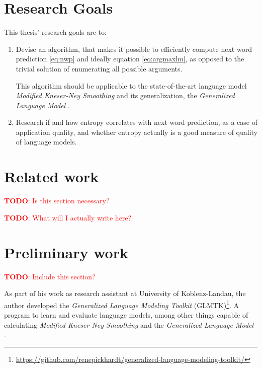 \documentclass[11pt,a4paper]{article}
\newcommand{\todo}[1]{\textcolor{red}{\textbf{TODO}: #1}}
\begin{document}
\section{Research Goals}

This thesis' research goals are to:
\begin{enumerate}[label=(\alph*)]
  \item
    Devise an algorithm, that makes it possible to efficiently compute
    next word prediction \eqref{eq:nwp} and ideally equation
    \eqref{eq:argmaxlm}, as opposed to the trivial solution of enumerating
    all possible arguments.

    This algorithm should be applicable to the state-of-the-art language model
    \emph{Modified Kneser-Ney Smoothing} \parencite{ChenGoodman1999} and its
    generalization, the \emph{Generalized Language Model}
    \parencite{Pickhardt2014}.

  \item
    Research if and how entropy correlates with next word prediction, as a case
    of application quality, and whether entropy actually is a good measure of
    quality of language models.
\end{enumerate}

\section{Related work}

\todo{Is this section necessary?}

\todo{What will I actually write here?}

\section{Preliminary work}

\todo{Include this section?}

As part of his work as research assistant at University of Koblenz-Landau,
the author developed the \emph{Generalized Language Modeling Toolkit}
(GLMTK)\footnote{\url{https://github.com/renepickhardt/generalized-language-modeling-toolkit/}}.
A program to learn and evaluate language models, among other things capable of
calculating \emph{Modified Kneser Ney Smoothing} \parencite{ChenGoodman1999} and
the \emph{Generalized Language Model} \parencite{Pickhardt2014}.
\end{document}
